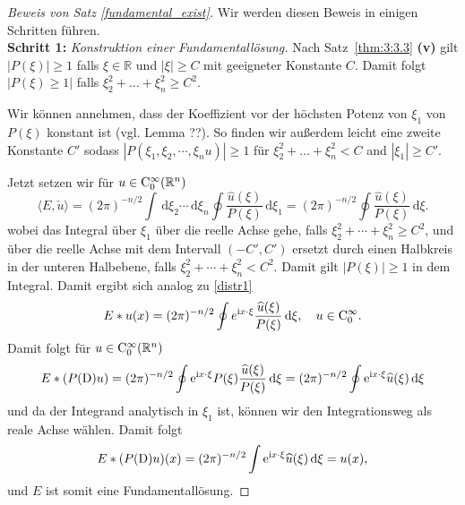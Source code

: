 \begin{proof}[Beweis von Satz \ref{fundamental_exist}]
Wir werden diesen Beweis in einigen Schritten führen.
\vspace{1mm}\\
\textbf{Schritt 1:} \emph{Konstruktion einer Fundamentallösung.}
Nach Satz~\ref{thm:3:3.3} {\bf (v)} gilt $|P(\xi)|\ge 1$ falls $\xi\in \mathbb R$ und $|\xi|\ge C$ mit geeigneter Konstante $C$.  Damit folgt $|P(\xi)\ge 1|$ falls $\xi_2^2+ \ldots + \xi_n^2 \ge C^2$.  

Wir können annehmen, dass der Koeffizient vor der höchsten Potenz von $\xi_1$ von $P(\xi)$ konstant ist (vgl. Lemma ??). 
So finden wir außerdem leicht eine zweite Konstante $C'$ sodass $|P(\xi_1, \xi_2, \cdots, \xi_nu)|\ge 1$ für $\xi_2^2+\ldots + \xi_n^2< C$ and $|\xi_1|\ge C'$.  

Jetzt setzen wir für $u\in\mathrm C_0^\infty(\mathbb R^n)$
\begin{equation}\label{distr3}
\langle E, \check u\rangle  = (2\pi)^{-n/2} \int \, \mathrm d\xi_2 \cdots \, \mathrm d\xi_n \oint \frac{\widehat u(\xi)}{P(\xi)} \, \mathrm d\xi_1= (2\pi)^{-n/2} \oint \frac{\widehat u(\xi)}{P(\xi)} \, \mathrm d\xi.
\end{equation}
wobei das Integral über $\xi_1$ über die reelle Achse gehe, falls $\xi_2^2+ \cdots + \xi_n^2 \ge C^2$, und über die reelle Achse mit dem Intervall $(-C', C')$ ersetzt durch einen Halbkreis in der unteren Halbebene, falls $\xi_2^2+ \cdots+ \xi_n^2 < C^2$. Damit gilt $|P(\xi)|\ge 1$  in dem Integral.  Damit ergibt sich analog zu \eqref{distr1}
\begin{equation}
E*u(x) = (2\pi)^{-n/2}\oint e^{\mathrm i x\cdot \xi } \frac{\widehat u(\xi)}{P(\xi)}\, \mathrm d\xi, \quad u \in \mathrm C_0^\infty.
\end{equation} 
Damit folgt für $u\in\mathrm C_0^\infty(\mathbb R^n)$
\begin{equation}
E*(P(\mathrm D)u) = (2\pi)^{-n/2} \oint \mathrm e^{\mathrm i x\cdot\xi} P(\xi)  \frac{\widehat{u} (\xi)}{P(\xi)}\, \mathrm d\xi=(2\pi)^{-n/2} \oint \mathrm e^{\mathrm i x\cdot \xi} \widehat u(\xi) \, \mathrm d\xi
\end{equation}
und da der Integrand analytisch in $\xi_1$ ist, können wir den Integrationsweg als reale Achse wählen. Damit folgt
\begin{equation}
E*(P(\mathrm D) u)(x) = (2\pi)^{-n/2} \int \mathrm e^{\mathrm i x\cdot \xi} \widehat u(\xi) \, \mathrm d\xi = u(x),
\end{equation}
und $E$ ist somit eine Fundamentallösung.


\end{proof}

